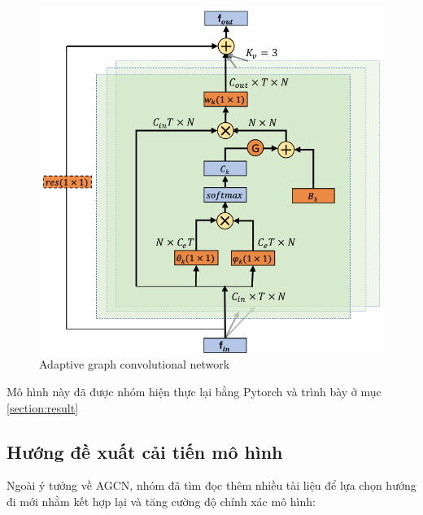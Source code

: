 \begin{figure}[!ht]
    \begin{center}
        \includegraphics[width=\linewidth]{asset/image/agcn.png}
        \caption{Adaptive graph convolutional network}
        \label{fig:agcn}
    \end{center}
\end{figure}

Mô hình này đã được nhóm hiện thực lại bằng Pytorch và trình bày ở mục \ref{section:result}

\subsection{Hướng đề xuất cải tiến mô hình}

Ngoài ý tưởng về AGCN, nhóm đã tìm đọc thêm nhiều tài liệu để lựa chọn hướng đi mới nhằm kết hợp lại và tăng cường độ chính xác mô hình:

